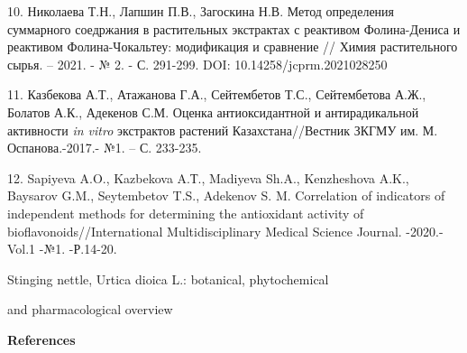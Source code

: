 \begin{references}
10. Николаева Т.Н., Лапшин П.В., Загоскина Н.В. Метод определения
суммарного соедржания в растительных экстрактах с реактивом
Фолина-Дениса и реактивом Фолина-Чокальтеу: модификация и сравнение //
Химия растительного сырья. -- 2021. - № 2. - С. 291-299. DOI:
10.14258/jcprm.2021028250

11. Казбекова А.Т., Атажанова Г.А., Сейтембетов Т.С., Сейтембетова А.Ж.,
Болатов А.К., Адекенов С.М. Оценка антиоксидантной и антирадикальной
активности \emph{in vitro} экстрактов растений Казахстана//Вестник
ЗКГМУ им. М. Оспанова.-2017.- №1. -- С. 233-235.

12. Sapiyeva A.O., Kazbekova A.Т., Madiyeva Sh.A., Kenzheshova A.K.,
Baysarov G.M., Seytembetov T.S., Adekenov S. M. Correlation of
indicators of independent methods for determining the antioxidant
activity of bioflavonoids//International Multidisciplinary Medical
Science Journal. -2020.-Vol.1 -№1. -Р.14-20.

Stinging nettle, Urtica dioica L.: botanical, phytochemical

and pharmacological overview
\end{references}

\begin{center}
{\bfseries References}
\end{center}


